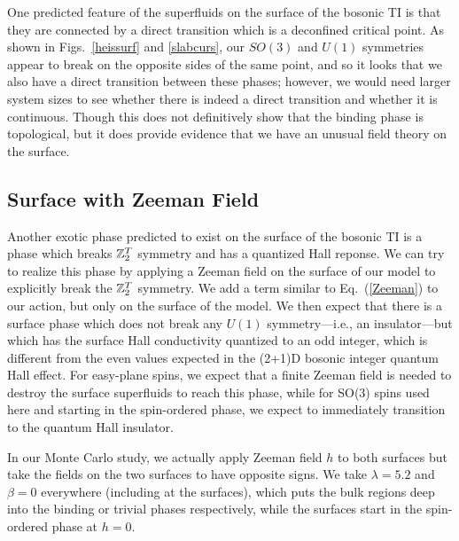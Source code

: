 One predicted feature of the superfluids on the surface of the bosonic TI is that they are connected by a direct transition which is a deconfined critical point.\cite{SenthilVishwanath} As shown in Figs.~\ref{heissurf} and \ref{slabcurs}, our $SO(3)$ and $U(1)$ symmetries appear to break on the opposite sides of the same point, and so it looks that we also have a direct transition between these phases; however, we would need larger system sizes to see whether there is indeed a direct transition and whether it is continuous.
Though this does not definitively show that the binding phase is topological, but it does provide evidence that we have an unusual field theory on the surface.


\subsection{Surface with Zeeman Field}
Another exotic phase predicted to exist on the surface of the bosonic TI is a phase which breaks $\mathbb{Z}_2^T$ symmetry and has a quantized Hall reponse. We can try to realize this phase by applying a Zeeman field on the surface of our model to explicitly break the $\mathbb{Z}_2^T$ symmetry. We add a term similar to Eq.~(\ref{Zeeman}) to our action, but only on the surface of the model. We then expect that there is a surface phase which does not break any $U(1)$ symmetry---i.e., an insulator---but which has the surface Hall conductivity quantized to an odd integer, which is different from the even values expected in the (2+1)D bosonic integer quantum Hall effect. For easy-plane spins, we expect that a finite Zeeman field is needed to destroy the surface superfluids to reach this phase, while for SO(3) spins used here and starting in the spin-ordered phase, we expect to immediately transition to the quantum Hall insulator.\cite{LesikAshvin}

In our Monte Carlo study, we actually apply Zeeman field $h$ to both surfaces but take the fields on the two surfaces to have opposite signs.  We take $\lambda=5.2$ and $\beta=0$ everywhere (including at the surfaces), which puts the bulk regions deep into the binding or trivial phases respectively, while the surfaces start in the spin-ordered phase at $h=0$.

